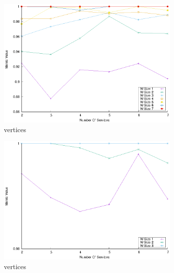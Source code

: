 \begin{figure}[!htb]
\begin{subfigure}{0.48\textwidth}
    \includegraphics[width=\textwidth]{Images/graphs/window_quality_performance_diff_qual_n7_s7_20_100_n7}
    \caption{ vertices}
    \label{fig:quality_window_wide_qualitative_n7}
  \end{subfigure}
  \begin{subfigure}{0.48\textwidth}
    \includegraphics[width=\textwidth]{Images/graphs/window_quality_performance_diff_qual_n7_s7_50_80_n3}
    \caption{ vertices}
    \label{fig:quality_window_average_qualitative_n3}
  \end{subfigure}
  \begin{subfigure}{0.48\textwidth}

\end{subfigure}
\end{figure}
